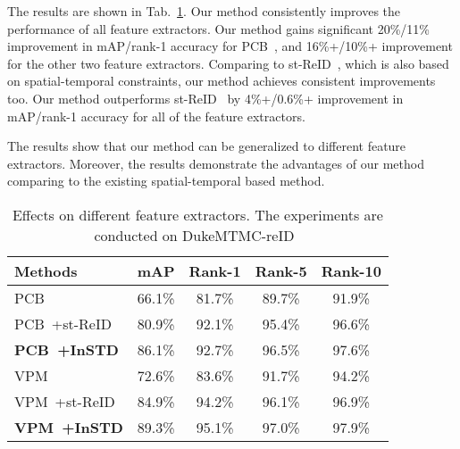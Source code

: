 \documentclass[10pt,twocolumn,letterpaper]{article}
\begin{document}
The results are shown in Tab.~\ref{tab:diff_feat}.
Our method consistently improves the performance of all feature extractors.
Our method gains significant 20\%/11\% improvement in mAP/rank-1 accuracy for PCB~\cite{2017Beyond}, and 16\%+/10\%+ improvement for the other two feature extractors.
Comparing to st-ReID~\cite{guangcong2019aaai}, which is also based on spatial-temporal constraints, our method achieves consistent improvements too.
Our method outperforms st-ReID~\cite{guangcong2019aaai} by 4\%+/0.6\%+ improvement in mAP/rank-1 accuracy for all of the feature extractors.

The results show that our method can be generalized to different feature extractors.
Moreover, the results demonstrate the advantages of our method comparing to the existing spatial-temporal based method.



\begin{table}[t]
\begin{center}
\setlength{\tabcolsep}{0.5mm}
{
\begin{tabular}{l | c | c | c | c}
\hline
\bf{Methods} & \bf{mAP} & \bf{Rank-1} & \bf{Rank-5} & \bf{Rank-10}  \\
\hline


PCB~\cite{2017Beyond} & 66.1\% & 81.7\% & 89.7\% & 91.9\% \\
PCB~\cite{2017Beyond}+st-ReID~\cite{guangcong2019aaai} & 80.9\% & 92.1\% & 95.4\% & 96.6\% \\
\textbf{PCB~\cite{2017Beyond}+InSTD} & 86.1\% & 92.7\% & 96.5\% & 97.6\% \\

\hline

VPM~\cite{Perceive2020Perceive} & 72.6\% & 83.6\% & 91.7\% & 94.2\% \\
VPM~\cite{Perceive2020Perceive}+st-ReID~\cite{guangcong2019aaai} & 84.9\% & 94.2\% & 96.1\% & 96.9\% \\
\textbf{VPM~\cite{Perceive2020Perceive}+InSTD} & 89.3\% & 95.1\% & 97.0\% & 97.9\% \\





\hline
\end{tabular}}
\end{center}
\caption{Effects on different feature extractors. The experiments are conducted on DukeMTMC-reID~\cite{Ergys2016Performance}}
\label{tab:diff_feat}
\end{table}
\end{document}
